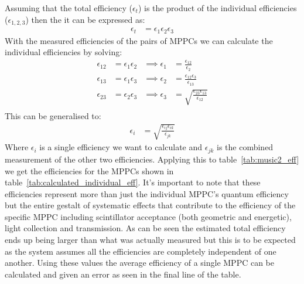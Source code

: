 Assuming that the total efficiency (\( \epsilon_t \)) is the product of the individual efficiencies (\( \epsilon_{1,2,3} \)) then the it can be expressed as:
\begin{align}
  \epsilon_t &= \epsilon_1  \epsilon_2  \epsilon_3
\end{align}
With the measured efficiencies of the pairs of MPPCs we can calculate the individual efficiencies by solving:
\begin{align*}
  \epsilon_{12} &= \epsilon_{1} \epsilon_{2} &\implies   \epsilon_{1}  &= \frac{\epsilon_{12}}{\epsilon_{2}}                       \\
  \epsilon_{13} &= \epsilon_{1} \epsilon_{3} &\implies   \epsilon_{2}  &= \frac{\epsilon_{12}\epsilon_{3}}{\epsilon_{13}}          \\
  \epsilon_{23} &= \epsilon_{2} \epsilon_{3} &\implies   \epsilon_{3}  &= \sqrt{\frac{\epsilon_{23}\epsilon_{13}}{\epsilon_{12}}}  \\
\end{align*} 
This can be generalised to:
\begin{align*}
  \epsilon_{i} &= \sqrt{\frac{\epsilon_{ij}\epsilon_{ik}}{\epsilon_{jk}}} \label{equ:individual_eff}
\end{align*}
Where \( \epsilon_i \) is a single efficiency we want to calculate and \( \epsilon_{jk} \) is the combined measurement of the other two efficiencies. Applying this to table~\ref{tab:music2_eff} we get the efficiencies for the MPPCs shown in table~\ref{tab:calculated_individual_eff}. It's important to note that these efficiencies represent more than just the individual MPPC's quantum efficiency but the entire gestalt of systematic effects that contribute to the efficiency of the specific MPPC including scintillator acceptance (both geometric and energetic), light collection and transmission. As can be seen the estimated total efficiency ends up being larger than what was actually measured but this is to be expected as the system assumes all the efficiencies are completely independent of one another. Using these values the average efficiency of a single MPPC can be calculated and given an error as seen in the final line of the table.

